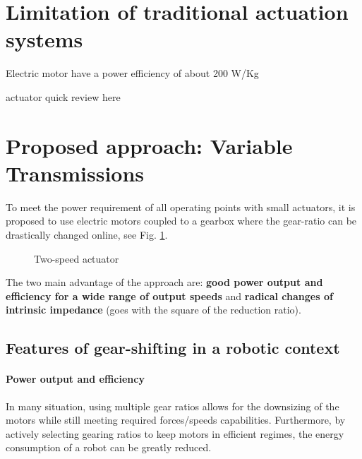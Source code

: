 \section{Limitation of traditional actuation systems}
\label{sec:limitationOfTraditionnalRoboticSystems}

Electric motor have a power efficiency of about 200 W/Kg

actuator quick review here


\section{Proposed approach: Variable Transmissions}
\label{sec:ProposedSolutionRobotsUsingMultipleGearRatioActuators}


To meet the power requirement of all operating points with small actuators, it is proposed to use electric motors coupled to a gearbox where the gear-ratio can be drastically changed online, see Fig. \ref{fig:2s}. 

\begin{figure}[htb]
        \centering
        \caption{Two-speed actuator}\label{fig:2s}
\end{figure}


The two main advantage of the approach are: \textbf{good power output and efficiency for a wide range of output speeds} and \textbf{radical changes of intrinsic impedance} (goes with the square of the reduction ratio). 

\subsection{Features of gear-shifting in a robotic context}

\paragraph{Power output and efficiency}
In many situation, using multiple gear ratios allows for the downsizing of the motors while still meeting required forces/speeds capabilities. Furthermore, by actively selecting gearing ratios to keep motors in efficient regimes, the energy consumption of a robot can be greatly reduced. 

